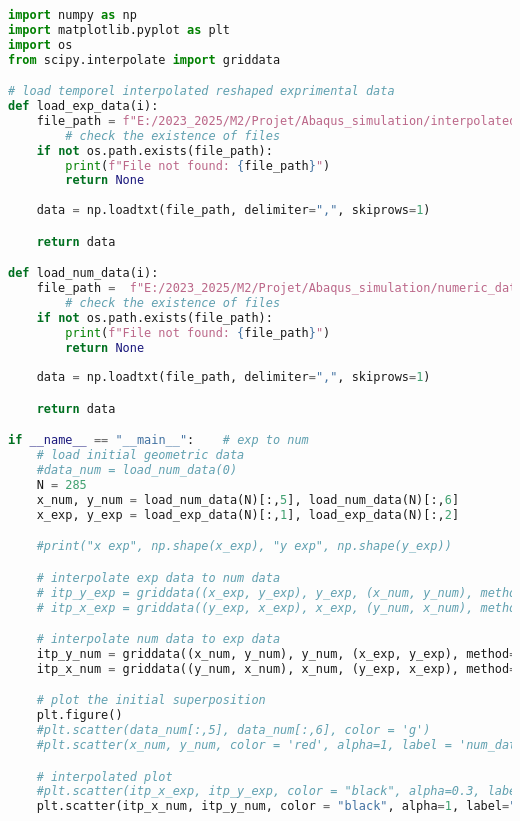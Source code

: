 \documentclass[12pt,a4paper]{article}
\begin{document}
\begin{lstlisting}[language=Python, caption={Superposition}]
import numpy as np
import matplotlib.pyplot as plt
import os
from scipy.interpolate import griddata

# load temporel interpolated reshaped exprimental data
def load_exp_data(i):
    file_path = f"E:/2023_2025/M2/Projet/Abaqus_simulation/interpolated_exp_data/image_{i:03}.csv"
        # check the existence of files
    if not os.path.exists(file_path):
        print(f"File not found: {file_path}")
        return None
    
    data = np.loadtxt(file_path, delimiter=",", skiprows=1)

    return data

def load_num_data(i):
    file_path =  f"E:/2023_2025/M2/Projet/Abaqus_simulation/numeric_data/champs_deformation/deformation_data_{i}.csv"
        # check the existence of files
    if not os.path.exists(file_path):
        print(f"File not found: {file_path}")
        return None
    
    data = np.loadtxt(file_path, delimiter=",", skiprows=1)

    return data

if __name__ == "__main__":    # exp to num
    # load initial geometric data
    #data_num = load_num_data(0)
    N = 285
    x_num, y_num = load_num_data(N)[:,5], load_num_data(N)[:,6]
    x_exp, y_exp = load_exp_data(N)[:,1], load_exp_data(N)[:,2]

    #print("x exp", np.shape(x_exp), "y exp", np.shape(y_exp))

    # interpolate exp data to num data
    # itp_y_exp = griddata((x_exp, y_exp), y_exp, (x_num, y_num), method='cubic')
    # itp_x_exp = griddata((y_exp, x_exp), x_exp, (y_num, x_num), method='cubic')

    # interpolate num data to exp data
    itp_y_num = griddata((x_num, y_num), y_num, (x_exp, y_exp), method='cubic')
    itp_x_num = griddata((y_num, x_num), x_num, (y_exp, x_exp), method='cubic')

    # plot the initial superposition
    plt.figure()
    #plt.scatter(data_num[:,5], data_num[:,6], color = 'g')
    #plt.scatter(x_num, y_num, color = 'red', alpha=1, label = 'num_data')

    # interpolated plot
    #plt.scatter(itp_x_exp, itp_y_exp, color = "black", alpha=0.3, label="interpolated_exp_data")
    plt.scatter(itp_x_num, itp_y_num, color = "black", alpha=1, label="interpolated_num_data")


\end{lstlisting}
\end{document}
